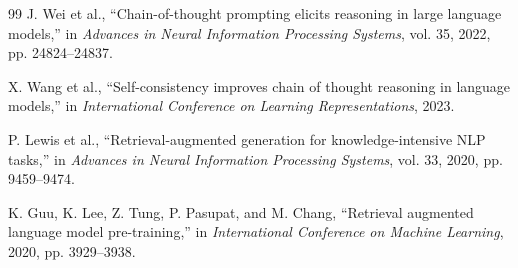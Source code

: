 \documentclass[conference]{IEEEtran}
\begin{document}
\begin{thebibliography}{99}
J. Wei et al., ``Chain-of-thought prompting elicits reasoning in large language models,'' in \textit{Advances in Neural Information Processing Systems}, vol. 35, 2022, pp. 24824--24837.

X. Wang et al., ``Self-consistency improves chain of thought reasoning in language models,'' in \textit{International Conference on Learning Representations}, 2023.

P. Lewis et al., ``Retrieval-augmented generation for knowledge-intensive NLP tasks,'' in \textit{Advances in Neural Information Processing Systems}, vol. 33, 2020, pp. 9459--9474.

K. Guu, K. Lee, Z. Tung, P. Pasupat, and M. Chang, ``Retrieval augmented language model pre-training,'' in \textit{International Conference on Machine Learning}, 2020, pp. 3929--3938.

\end{thebibliography}
\end{document}
